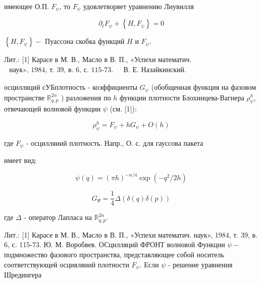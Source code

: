 \documentclass[10pt]{article}
\begin{document}
имеющее О.П. $F_{\psi}$, то $F_{\psi}$ удовлетворяет уравнению Лиувилля



\[

\partial_{t} F_{\psi}+\left\{H, F_{\psi}\right\}=0

\]



$\left\{H, F_{\psi}\right\}-$ Пуассона скобка функций $H$ и $F_{\psi}$.



Лит.: [1] Карасе в М. В., Масло в В. П., «Успехи математич. $\begin{array}{ll}\text { наук», 1984, т. 39, в. 6, с. 115-73. } & \text { В. Е. Назайкинский. }\end{array}$



осцилляций сУБплотность - коэффициенты $G_{\psi}$ (обобщенная функция на фазовом пространстве $\mathbb{R}_{q, p}^{2 n}$ ) разложения по $h$ функции плотности Блохинцева-Вагнера $\rho_{\psi}^{h}$, отвечающей волновой функции $\psi$ (см. [1]):



\[

\rho_{\psi}^{h}=F_{\psi}+h G_{\psi}+O(h)

\]



где $F_{\psi}$ - осцилляиий плотность. Напр., О. с. для гауссова пакета



имеет вид:



\[

\psi(q)=(\pi h)^{-n / 4} \exp \left(-q^{2} / 2 h\right)

\]



\[

G_{\Psi}=\frac{1}{4} \Delta(\delta(q) \delta(p))

\]



где $\Delta$ - оператор Лапласа на $\mathbb{R}_{q, p}^{2 n}$.



Лит.: [1] Карасе в М. В., Масло в В. П., «Успехи математич. наук», 1984, т. 39, в. 6, с. 115-73. Ю. М. Воробвев. ОСцилляций ФРОНТ волновой Функции $\psi-$ подмножество фазового пространства, представляющее собой носитель соответствующей осцияляиий плотности $F_{\psi}$. Если $\psi$ - решение уравнения Шредингера
\end{document}
